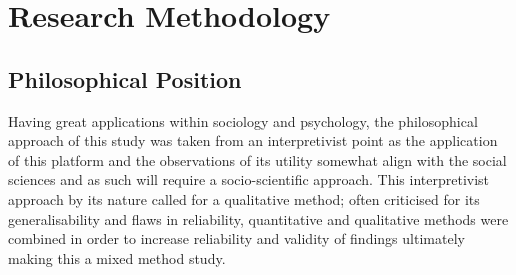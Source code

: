 \documentclass[lettersize,journal]{IEEEtran}
\begin{document}
\section{Research Methodology}

        \subsection{Philosophical Position}
        Having great applications within sociology and psychology, the philosophical approach of this study was taken from an 
        interpretivist point as the application of this platform and the observations of its utility somewhat align with the social
         sciences and as such will require a socio-scientific approach. This interpretivist approach by its nature called for a qualitative
         method; often criticised for its generalisability and flaws in reliability, quantitative and qualitative methods were combined
         in order to increase reliability and validity of findings ultimately making this a mixed method study.
\end{document}
